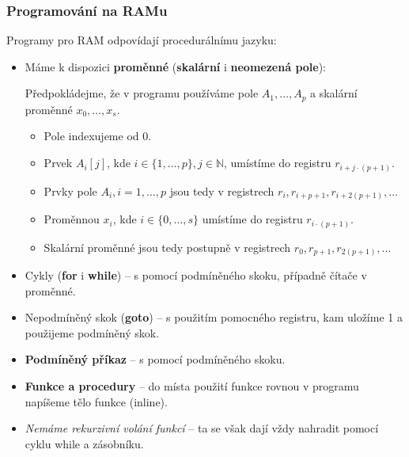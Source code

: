 \documentclass[11pt]{report} %
\newcommand{\N}{\mathbb{N}}
\numberwithin{equation}{section}
\begin{document}
\subsubsection{Programování na RAMu}
Programy pro RAM odpovídají procedurálnímu jazyku:
\begin{itemize}
	
	
	\item Máme k dispozici \textbf{proměnné} (\textbf{skalární} i \textbf{neomezená pole}):
	
	Předpokládejme, že v programu používáme pole $A_1, \dots, A_p$ a skalární proměnné $x_0, \dots, x_s$.
	\begin{itemize}
		
		
		
		\item Pole indexujeme od 0.
		\item Prvek $A_i[j]$, kde $i \in \{1, \dots, p\}, j \in \N$, umístíme do registru $r_{i+j\cdot(p+1)}$.
		\item Prvky pole $A_i, i = 1, \dots, p$ jsou tedy v registrech $r_i, r_{i+p+1}, r_{i+2(p+1)}, \dots$
		\item Proměnnou $x_i$, kde $i \in \{0, \dots, s\}$ umístíme do registru $r_{i\cdot(p+1)}$.
		\item Skalární proměnné jsou tedy postupně v registrech $r_0, r_{p+1}, r_{2(p+1)}, \dots$
	\end{itemize}

	\item Cykly (\textbf{for} i \textbf{while}) – s pomocí podmíněného skoku, případně čítače v proměnné.
	\item Nepodmíněný skok (\textbf{goto}) – s použitím pomocného registru, kam uložíme 1 a použijeme podmíněný skok.
	\item \textbf{Podmíněný příkaz} – s pomocí podmíněného skoku.
	\item \textbf{Funkce a procedury} – do místa použití funkce rovnou v programu napíšeme tělo funkce (inline).
	\item \textit{Nemáme rekurzivní volání funkcí} – ta se však dají vždy nahradit pomocí cyklu while a zásobníku.	
\end{itemize}
\end{document}
